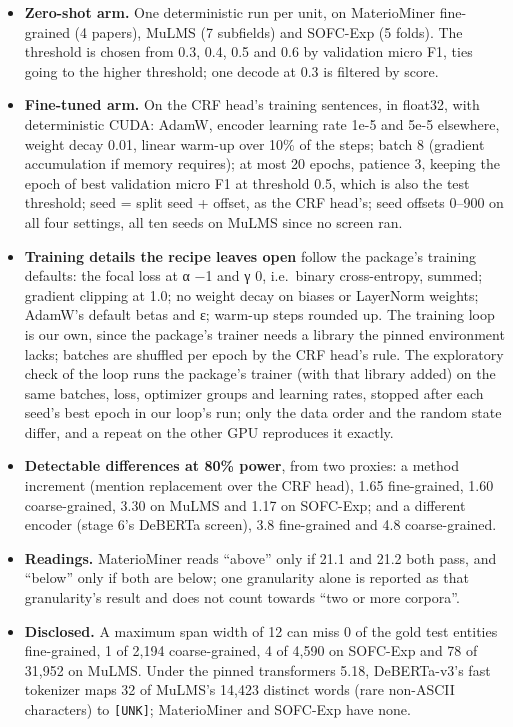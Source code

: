 \documentclass[11pt,a4paper]{article}
\begin{document}
\begin{itemize}
\item
  \textbf{Zero-shot arm.} One deterministic run per unit, on MaterioMiner
  fine-grained (4 papers), MuLMS (7 subfields) and SOFC-Exp (5 folds). The
  threshold is chosen from 0.3, 0.4, 0.5 and 0.6 by validation micro F1,
  ties going to the higher threshold; one decode at 0.3 is filtered by
  score.
\item
  \textbf{Fine-tuned arm.} On the CRF head's training sentences, in float32,
  with deterministic CUDA: AdamW, encoder learning rate 1e-5 and 5e-5
  elsewhere, weight decay 0.01, linear warm-up over 10\% of the steps;
  batch 8 (gradient accumulation if memory requires); at most 20 epochs,
  patience 3, keeping the epoch of best validation micro F1 at threshold
  0.5, which is also the test threshold; seed = split seed + offset, as
  the CRF head's; seed offsets 0--900 on all four settings, all ten seeds
  on MuLMS since no screen ran.
\item
  \textbf{Training details the recipe leaves open} follow the package's
  training defaults: the focal loss at α −1 and γ 0, i.e.~binary
  cross-entropy, summed; gradient clipping at 1.0; no weight decay on
  biases or LayerNorm weights; AdamW's default betas and ε; warm-up steps
  rounded up. The training loop is our own, since the package's trainer
  needs a library the pinned environment lacks; batches are shuffled per
  epoch by the CRF head's rule. The exploratory check of the loop runs the
  package's trainer (with that library added) on the same batches, loss,
  optimizer groups and learning rates, stopped after each seed's best
  epoch in our loop's run; only the data order and the random state
  differ, and a repeat on the other GPU reproduces it exactly.
\item
  \textbf{Detectable differences at 80\% power}, from two proxies: a method
  increment (mention replacement over the CRF head), 1.65 fine-grained,
  1.60 coarse-grained, 3.30 on MuLMS and 1.17 on SOFC-Exp; and a different
  encoder (stage 6's DeBERTa screen), 3.8 fine-grained and 4.8
  coarse-grained.
\item
  \textbf{Readings.} MaterioMiner reads ``above'' only if 21.1 and 21.2 both
  pass, and ``below'' only if both are below; one granularity alone is
  reported as that granularity's result and does not count towards ``two or
  more corpora''.
\item
  \textbf{Disclosed.} A maximum span width of 12 can miss 0 of the gold test
  entities fine-grained, 1 of 2,194 coarse-grained, 4 of 4,590 on SOFC-Exp
  and 78 of 31,952 on MuLMS. Under the pinned transformers 5.18,
  DeBERTa-v3's fast tokenizer maps 32 of MuLMS's 14,423 distinct words
  (rare non-ASCII characters) to \texttt{{[}UNK{]}}; MaterioMiner and SOFC-Exp have
  none.
\end{itemize}
\end{document}
